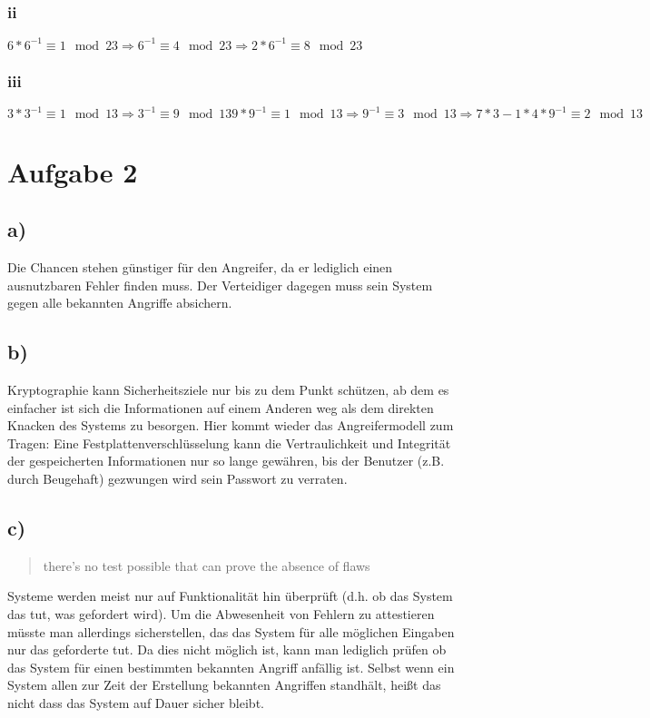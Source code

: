 \documentclass[10pt,a4paper]{article}
\begin{document}
\subsubsection*{ii} \begin{math}   6 * 6^{-1} \equiv 1 \mod 23 \Rightarrow 6^{-1} \equiv 4 \mod 23 \Rightarrow 2 * 6^{-1} \equiv 8 \mod 23 \end{math}
\subsubsection*{iii} 
\begin{math}   
3*3^{-1} \equiv 1 \mod 13  \Rightarrow 3^{-1} \equiv 9 \mod 13 
9*9^{-1} \equiv 1 \mod 13 \Rightarrow 9^{-1} \equiv  3 \mod 13
\Rightarrow 7*3-1*4*9^{-1} \equiv 2 \mod 13
\end{math}



\section*{Aufgabe 2}
\subsection*{a)} Die Chancen stehen günstiger für den Angreifer, da er lediglich einen ausnutzbaren Fehler finden muss. Der Verteidiger dagegen muss sein System gegen alle bekannten Angriffe absichern.
\subsection*{b)} Kryptographie kann Sicherheitsziele nur  bis zu dem Punkt schützen, ab dem es einfacher ist sich die Informationen auf einem Anderen weg als dem direkten Knacken des Systems zu besorgen. Hier kommt wieder das Angreifermodell zum Tragen: Eine Festplattenverschlüsselung kann die Vertraulichkeit und Integrität der gespeicherten Informationen nur so lange gewähren, bis der Benutzer (z.B. durch Beugehaft) gezwungen wird sein Passwort zu verraten.
\subsection*{c)} 
\begin{quote}
there’s no test possible that can prove the absence of flaws
\end{quote}
Systeme werden meist nur auf Funktionalität hin überprüft (d.h. ob das System das tut, was gefordert wird). Um die Abwesenheit von Fehlern zu attestieren müsste man allerdings sicherstellen, das das System für alle möglichen Eingaben nur das geforderte tut. Da dies nicht möglich ist, kann man lediglich prüfen ob das System für einen bestimmten bekannten Angriff anfällig ist. Selbst wenn ein System allen zur Zeit der Erstellung bekannten Angriffen standhält, heißt das nicht
dass das System auf Dauer sicher bleibt.
\end{document}
